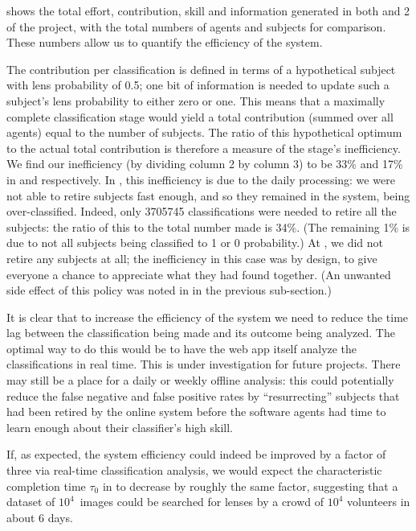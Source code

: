 \documentclass[useAMS,usenatbib,a4paper]{mn2e}
\begin{document}
 shows the total effort, contribution, skill and
information generated in both \StageOne and 2 of the \cfhtls project, with the
total numbers of agents and subjects for comparison.   These numbers allow us
to quantify the efficiency of the system.

The contribution per classification is defined in terms of a hypothetical
subject with lens probability of 0.5; one bit of information is needed to
update such a subject's lens probability to either zero or one. This means
that a maximally complete classification stage would yield a total
contribution (summed over all agents) equal to the number of subjects. The
ratio of this hypothetical optimum to the actual total contribution is
therefore a measure of the stage's inefficiency. We find our inefficiency (by
dividing column 2 by column 3) to be 33\% and 17\% in \StageOne and \StageTwo
respectively. In \StageOne, this inefficiency is due to the daily processing: we
were not able to retire subjects fast enough, and so they remained in the
system, being over-classified. Indeed, only 3705745 classifications were
needed to retire all the subjects: the ratio of this to the total number made
is 34\%. (The remaining 1\% is due to not all subjects being classified to 1
or 0 probability.) At \StageTwo, we did not retire any subjects at all; the
inefficiency in this case was by design, to give everyone a chance to
appreciate what they had found together. (An unwanted side effect of this
policy was noted in  in the
previous sub-section.)

It is clear that to increase the efficiency of the system we need to reduce the
time lag between the classification being made and its outcome being analyzed.
The optimal way to do this would be to have the web app itself analyze the
classifications in real time. This is under investigation for future projects.
There may still be a place for a daily or weekly offline analysis: this could
potentially reduce the false negative and false positive rates by
``resurrecting'' subjects that had been retired by the online system before the
software agents had time to learn enough about their classifier's high skill.

If, as expected, the system efficiency could indeed be improved by a factor of
three via real-time classification analysis, we would expect the characteristic
completion time $\tau_0$  in  to decrease by roughly the same
factor, suggesting that a dataset of $10^4$~images could be searched for lenses
by a crowd of $10^4$ volunteers in about 6 days.
\end{document}
